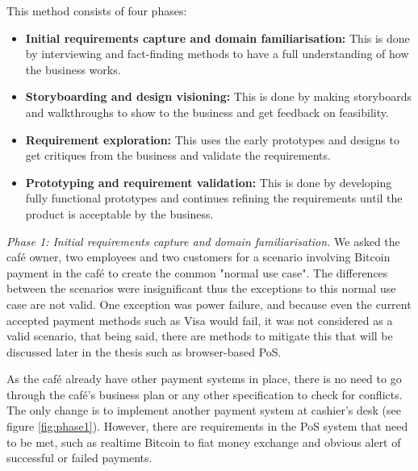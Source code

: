 This method consists of four phases:
\begin{itemize}

\item \textbf{Initial requirements capture and domain familiarisation: } This is done by interviewing and fact-finding methods to have a full understanding of how the business works.

\item \textbf{Storyboarding and design visioning: } This is done by making storyboards and walkthroughs to show to the business and get feedback on feasibility.

\item \textbf{Requirement exploration: } This uses the early prototypes  and designs to get critiques from the business and validate the requirements.

\item \textbf{Prototyping and requirement validation: } This is done by developing fully functional prototypes and continues refining the requirements until the product is acceptable by the business.

\end{itemize}

\textit{Phase 1: Initial requirements capture and domain familiarisation.} We asked the caf\'{e} owner, two employees and two customers for a scenario involving Bitcoin payment in the caf\'{e} to create the common "normal use case". The differences between the scenarios were insignificant thus the exceptions to this normal use case are not valid. One exception was power failure, and because even the current accepted payment methods such as Visa would fail, it was not considered as a valid scenario, that being said, there are methods to mitigate this that will be discussed later in the thesis such as browser-based PoS.


As the caf\'{e} already have other payment systems in place, there is no need to go through the caf\'{e}'s business plan or any other specification to check for conflicts. The only change is to implement another payment system at cashier's desk (see figure \ref{fig:phase1}).
However, there are requirements in the PoS system that need to be met, such as realtime Bitcoin to fiat money exchange and obvious alert of successful or failed payments.

